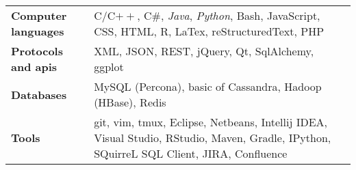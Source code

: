 \documentclass[10pt]{article}
\begin{document}
\begin{tabular}{l p{32em}}
  \textbf{Computer languages}  & C/C$++$, C\#, \emph{Java}, \emph{Python}, Bash, JavaScript, CSS, HTML, R, LaTex, reStructuredText, PHP\\ 
  \textbf{Protocols and apis}  & XML, JSON, REST, jQuery, Qt, SqlAlchemy, ggplot\\
  \textbf{Databases}           & MySQL (Percona), basic of Cassandra, Hadoop (HBase), Redis  \\
  \textbf{Tools}               & git, vim, tmux, Eclipse, Netbeans, Intellij IDEA, Visual Studio, RStudio, Maven, Gradle,
                                 IPython, SQuirreL SQL Client, JIRA, Confluence\\
\end{tabular}
\end{document}
